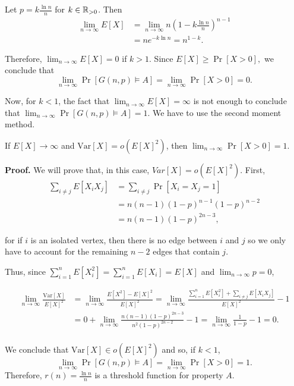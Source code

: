 Let $\displaystyle{p = k\frac{\ln n}{n}}$ for $k \in \mathbb{R}_{>0}$. Then
\begin{align*}
    \lim_{n \to \infty} E[X] &= \lim_{n \to \infty} n\left(1 - k\frac{\ln n}{n}\right)^{n - 1} \\
    &= ne^{-k\ln n} = n^{1 - k}.
\end{align*}

Therefore, $\lim_{n \to \infty} E[X] = 0$ if $k > 1$. Since \(E[X] \geq \Pr[X > 0],\) we conclude that \[\lim_{n \to \infty} \Pr[G(n, p) \vDash A] =  \lim_{n \to \infty} \Pr[X > 0] = 0.\] \par
Now, for $k < 1$, the fact that $\lim_{n \to \infty} E[X] = \infty$ is not enough to conclude that \(\lim_{n \to \infty} \Pr[G(n, p) \vDash A] = 1\). We have to use the second moment method. \par

\begin{theorem*}
    If $E[X] \to \infty$ and $\text{Var}[X] = o(E[X]^2)$, then $\lim_{n \to \infty} \Pr[X > 0] = 1$. \cite{alon2016probabilistic}
\end{theorem*}

\textbf{Proof. } We will prove that, in this case, $Var[X] = o(E[X]^2)$. First, 
\begin{align*}
    \sum_{i \neq j}E[X_iX_j] &= \sum_{i \neq j} \Pr[X_i = X_j = 1] \\
    &= n(n - 1)(1 - p)^{n -1}(1 - p)^{n - 2} \\ &= n(n - 1)(1 - p)^{2n - 3},
\end{align*}

for if $i$ is an isolated vertex, then there is no edge between $i$ and $j$ so we only have to account for the remaining $n - 2$ edges that contain $j$.  \par

Thus, since $\sum_{i = 1}^{n}E[X_i^2] =  \sum_{i = 1}^n E[X_i] = E[X]$ and $\lim_{n \to \infty} p = 0$,

\begin{align*}
    \lim_{n \to \infty} \frac{\text{Var}[X]}{E[X]^2} &= 
    \lim_{n \to \infty}\frac{E[X^2] - E[X]^2}{E[X]^2} = \lim_{n \to \infty} \frac{\sum_{i = 1}^n E[X_i^2] + \sum_{i \neq j}E[X_iX_j]}{E[X]^2} - 1 \\ &= 0 + \lim_{n \to \infty} \frac{ n(n - 1)(1 - p)^{2n - 3}}{n^2(1 - p)^{2n - 2}} - 1= \lim_{n \to \infty} \frac{1}{1 - p} - 1 = 0.\\
\end{align*} \par
We conclude that $\text{Var}[X] \in o(E[X]^2)$ and so, if $k < 1$, \[\lim_{n \to \infty} \Pr[G(n, p) \vDash A] = \lim_{n \to \infty} \Pr[X > 0] = 1.\] Therefore, $r(n) = \frac{\ln n}{n}$ is a threshold function for property $A$.
